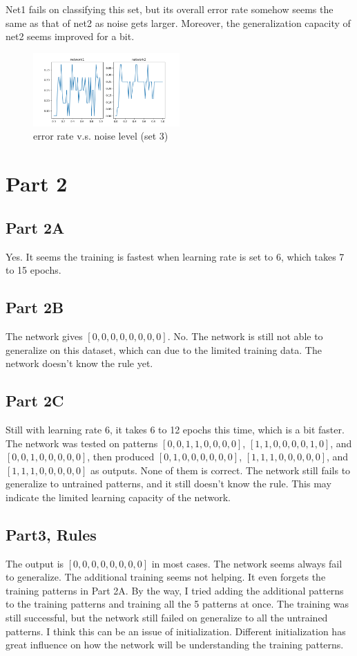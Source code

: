 \documentclass{article}
\begin{document}
Net1 fails on classifying this set, but its overall error rate somehow seems the same as that of net2 as noise gets larger. Moreover, the generalization capacity of net2 seems improved for a bit.
\begin{figure}[!ht]
    \centering
    \includegraphics[width=0.5\textwidth]{part1set3g.png}
    \caption{error rate v.s. noise level (set 3)}
\end{figure}
\newpage

\section*{Part 2}
\subsection*{Part 2A}
Yes. It seems the training is fastest when learning rate is set to 6, which takes 7 to 15 epochs.
\subsection*{Part 2B}
The network gives $[0, 0, 0, 0, 0, 0, 0, 0]$. No. The network is still not able to generalize on this dataset, which can due to the limited training data. The network doesn't know the rule yet.
\subsection*{Part 2C}
Still with learning rate 6, it takes 6 to 12 epochs this time, which is a bit faster. The network was tested on patterns $[0, 0, 1, 1, 0, 0, 0, 0]$, $[1, 1, 0, 0, 0, 0, 1, 0]$, and $[0, 0, 1, 0, 0, 0, 0, 0]$, then produced $[0, 1, 0, 0, 0, 0, 0, 0]$, $[1, 1, 1, 0, 0, 0, 0, 0]$, and $[1, 1, 1, 0, 0, 0, 0, 0]$ as outputs. None of them is correct. The network still fails to generalize to untrained patterns, and it still doesn't know the rule. This may indicate the limited learning capacity of the network.
\subsection*{Part3, Rules}
The output is $[0, 0, 0, 0, 0, 0, 0, 0]$ in most cases. The network seems always fail to generalize. The additional training seems not helping. It even forgets the training patterns in Part 2A. By the way, I tried adding the additional patterns to the training patterns and training all the 5 patterns at once. The training was still successful, but the network still failed on generalize to all the untrained patterns. I think this can be an issue of initialization. Different initialization has great influence on how the network will be understanding the training patterns. 
\end{document}
